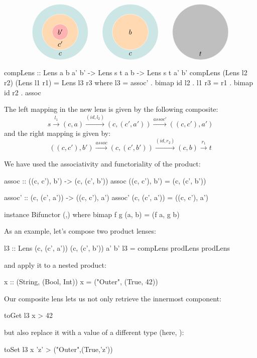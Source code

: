 \documentclass[DaoFP]{subfiles}
\begin{document}
\[
\begin{tikzpicture}
\filldraw[fill=blue!50!green!20, draw=white] (0, 0) circle (1.4);
\filldraw[fill=orange!30, draw=white] (0, 0) circle (0.9);
\filldraw[fill=red!30, draw=white] (0, 0) circle (0.4);
\node at (0, 0) {$b'$};
\node at (0, -0.6) {$c'$};
\node at (0, -1.1) {$c$};
\end{tikzpicture}
\hspace{20pt}
\begin{tikzpicture}
\filldraw[fill=blue!50!green!20, draw=white] (0, 0) circle (1.4);
\filldraw[fill=orange!30, draw=white] (0, 0) circle (0.9);
\node at (0, 0) {$b$};
\node at (0, -1.1) {$c$};
\end{tikzpicture}
\hspace{20pt}
\begin{tikzpicture}
\filldraw[fill=gray!50, draw=white] (0, 0) circle (1.4);
\node at (0, -1.1) {$t$};
\end{tikzpicture}
\]



\begin{haskell}
compLens :: Lens a b a' b' -> Lens s t a b -> Lens s t a' b'
compLens (Lens l2 r2) (Lens l1 r1) = Lens l3 r3
  where l3 = assoc' . bimap id l2  . l1
        r3 = r1 . bimap id r2 . assoc
\end{haskell}
The left mapping in the new lens is given by the following composite:
\[ s \xrightarrow{l_1} (c, a)   \xrightarrow{(id, l_2)} (c, (c', a'))  \xrightarrow{assoc'} ((c, c'), a')\]
and the right mapping is given by:
\[ ((c, c'), b') \xrightarrow{assoc}  (c, (c', b')) \xrightarrow{(id, r_2)} (c, b) \xrightarrow{r_1} t \]

We have used the associativity and functoriality of the product:
\begin{haskell}
assoc :: ((c, c'), b') -> (c, (c', b'))
assoc ((c, c'), b') = (c, (c', b'))

assoc' :: (c, (c', a')) -> ((c, c'), a')
assoc' (c, (c', a')) = ((c, c'), a')

instance Bifunctor (,) where
  bimap f g (a, b) = (f a, g b)
\end{haskell}

As an example, let's compose two product lenses:
\begin{haskell}
l3 :: Lens (c, (c', a')) (c, (c', b')) a' b'
l3 = compLens prodLens prodLens
\end{haskell}
and apply it to a nested product:
\begin{haskell}
x :: (String, (Bool, Int))
x = ("Outer", (True, 42))
\end{haskell}
Our composite lens lets us not only retrieve the innermost component:
\begin{haskell}
toGet l3 x
> 42
\end{haskell}
but also replace it with a value of a different type (here, ):
\begin{haskell}
toSet l3 x 'z'
> ("Outer",(True,'z'))
\end{haskell}
\end{document}
